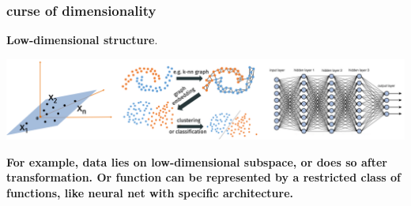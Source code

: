 \documentclass[compress]{beamer}
\newcommand{\bv}[1]{\mathbf{#1}}
\newcommand{\R}{\mathbb{R}}
\begin{document}
\begin{frame}[t]
	\frametitle{curse of dimensionality}
	\begin{center}
		\alert{\textbf{Low-dimensional structure}}. 
		\vspace{1em}
		
		\includegraphics[width=\textwidth]{lowdim_structure.png}
		\vspace{1em}
		
		\textbf{For example, data lies on low-dimensional subspace, or does so after transformation. Or function can be represented by a restricted class of functions, like neural net with specific architecture.}
	\end{center}
\end{frame}

%	
%
%	
%	
\end{document}
